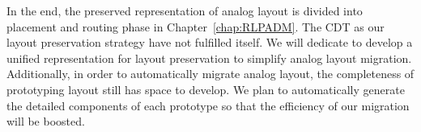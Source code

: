     In the end, the preserved representation of analog layout is divided into placement and routing phase in Chapter~\ref{chap:RLPADM}. The CDT as our layout preservation strategy have not fulfilled itself. We will dedicate to develop a unified representation for layout preservation to simplify analog layout migration. Additionally, in order to automatically migrate analog layout, the completeness of prototyping layout still has space to develop. We plan to automatically generate the detailed components of each prototype so that the efficiency of our migration will be boosted. 